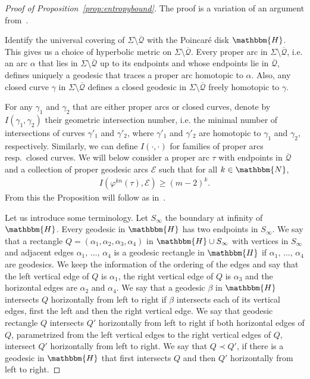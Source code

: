 \documentclass[AHL,Unicode,longabstracts,published]{cedram}
\newcommand{\N}{\mathbbm{N}}
\newcommand{\Hy}{\mathbbm{H}}
\newcommand{\clQ}{\mathcal{Q}}
\newcommand{\clE}{\mathcal{E}}
\begin{document}
\begin{proof}[Proof of Proposition~\ref{prop:entropybound}]
The proof is a variation of an argument from~\cite{FranksHandel1988}.

Identify the universal covering of $\Sigma \setminus \overline{\clQ}$ with the Poincaré disk $\Hy$. This gives us a choice of hyperbolic metric on $\Sigma \setminus \overline{\clQ}$. Every proper arc in $\Sigma \setminus \overline{\clQ}$, i.e. an arc $\alpha$ that lies in $\Sigma\setminus \overline{\clQ}$ up to its endpoints and whose endpoints lie in $\overline{\clQ}$, defines uniquely a geodesic that traces a proper arc homotopic to $\alpha$. Also, any closed curve $\gamma$ in $\Sigma\setminus \overline{\clQ}$ defines a closed geodesic in $\Sigma \setminus \overline{\clQ}$ freely homotopic to $\gamma$.

For any $\gamma_1$ and $\gamma_2$ that are either proper arcs or closed curves, denote by $I(\gamma_1, \gamma_2)$ their geometric intersection number, i.e. the minimal number of intersections of curves $\gamma'_1$ and $\gamma'_2$, where $\gamma'_1$ and $\gamma'_2$ are homotopic to $\gamma_1$ and $\gamma_2$, respectively. Similarly, we can define $I(\cdot, \cdot)$ for families of proper arcs resp.\ closed curves. We will below consider a proper arc $\tau$ with endpoints in $\overline{\clQ}$ and a collection of proper geodesic arcs $\clE$ such that for all $k\in \N$,
\begin{align}\label{intersection}
I(\varphi^{kn}(\tau), \clE) \geq (m-2)^k.
\end{align}
From this the Proposition will follow as in~\cite{FranksHandel1988}.



Let us introduce some terminology. Let $S_{\infty}$ the boundary at infinity of $\Hy$. Every geodesic in $\Hy$ has two endpoints in $S_{\infty}$. We say that a rectangle $Q=(\alpha_1, \alpha_2, \alpha_3, \alpha_4)$ in $\Hy \cup S_{\infty}$ with vertices in $S_{\infty}$ and adjacent edges $\alpha_1, \,\ldots,\, \alpha_4$ is a geodesic rectangle in $\Hy$ if $\alpha_1,\, \ldots, \,\alpha_4$ are geodesics. We keep the information of the ordering of the edges and say that the left vertical edge of $Q$ is $\alpha_1$, the right vertical edge of $Q$ is $\alpha_3$ and the horizontal edges are $\alpha_2$ and $\alpha_4$. We say that a geodesic $\beta$ in $\Hy$ intersects $Q$ horizontally from left to right if $\beta$ intersects each of its vertical edges, first the left and then the right vertical edge. We say that geodesic rectangle $Q$ intersects $Q'$ horizontally from left to right if both horizontal edges of $Q$, parametrized from the left vertical edges to the right vertical edges of $Q$, intersect $Q'$ horizontally from left to right. We say that $Q\prec Q'$, if there is a geodesic in $\Hy$ that first intersects $Q$ and then $Q'$ horizontally from left to right.


\end{proof}
\end{document}
